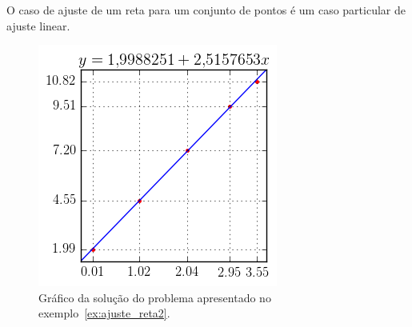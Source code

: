 O caso de ajuste de um reta para um conjunto de pontos é um caso particular de ajuste linear.

\begin{figure}
  \centering
  \includegraphics{cap_ajuste/pics/ex_ajuste_reta2/ex_ajuste_reta2}
  \caption{Gráfico da solução do problema apresentado no exemplo~\ref{ex:ajuste_reta2}.}
  \label{fig:ex_ajuste_reta2}
\end{figure}

